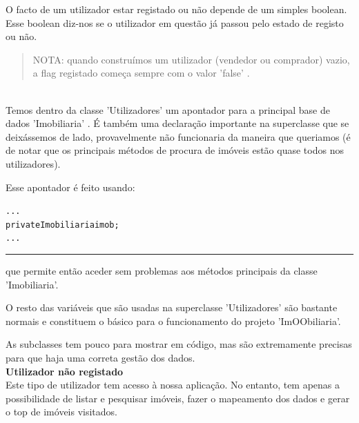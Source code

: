\documentclass[12pt]{article}
\newenvironment{code}                    
{\textbf{
} \hspace{1cm} \hrulefill \\ 
\smallskip 
\begin{center}
\begin{minipage}{0.9\textwidth} 
\begin{alltt}\small}
{\end{alltt}
\end{minipage}
\end{center}
\hrule\smallskip
}
\begin{document}
O facto de um utilizador estar registado ou não depende de um simples boolean.\\ 

Esse boolean diz-nos se o utilizador em questão já passou pelo estado de registo ou não.
~\\
\newline
\begin{quote}
NOTA: quando construímos um utilizador (vendedor ou comprador) vazio, a flag registado começa sempre com o valor 'false' .
\end{quote}

~\\

Temos dentro da classe 'Utilizadores' um apontador para a principal base de dados 'Imobiliaria' . 
É também uma declaração importante na superclasse que se deixássemos de lado, provavelmente não funcionaria da maneira que queriamos (é de notar que os principais métodos de procura de imóveis estão quase todos nos utilizadores).
\newline

Esse apontador é feito usando:
\newline
\begin{code}
...
    private Imobiliaria imob;
...
\end{code}
que permite então aceder sem problemas aos métodos principais da classe 'Imobiliaria'.
\newline

O resto das variáveis que são usadas na superclasse 'Utilizadores' são bastante normais e constituem o básico para o funcionamento do projeto 'ImOObiliaria'.
\newline

As subclasses tem pouco para mostrar em código, mas são extremamente precisas para que haja uma correta gestão dos dados.
~\\

\textbf{Utilizador não registado}
~\\

Este tipo de utilizador tem acesso à nossa aplicação. No entanto, tem apenas a possibilidade de listar e pesquisar imóveis, fazer o mapeamento dos dados e gerar o top de imóveis visitados.
~\\
\end{document}
